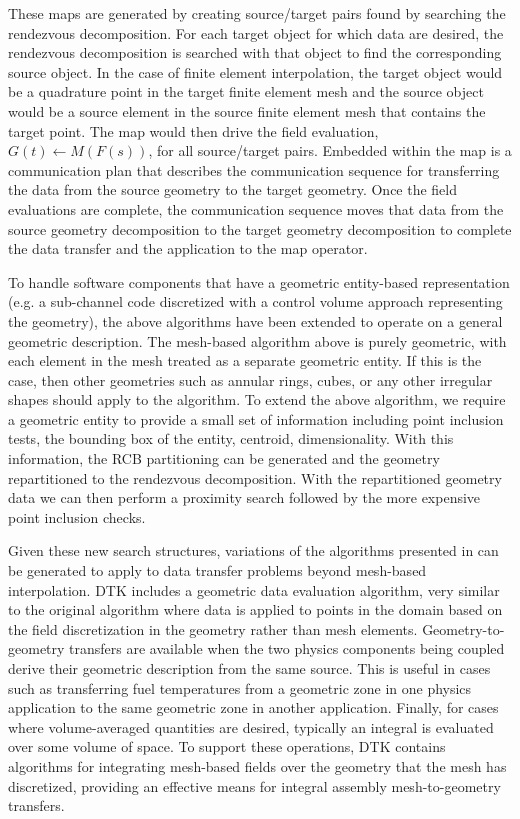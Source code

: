 \documentclass{mc2013}
\begin{document}
These maps are generated by creating source/target pairs found by
searching the rendezvous decomposition. For each target object for
which data are desired, the rendezvous decomposition is searched with
that object to find the corresponding source object. In the case of
finite element interpolation, the target object would be a quadrature
point in the target finite element mesh and the source object would be
a source element in the source finite element mesh that contains the
target point. The map would then drive the field evaluation,
$G(t)\leftarrow M(F(s))$, for all source/target pairs. Embedded within
the map is a communication plan that describes the communication
sequence for transferring the data from the source geometry to the
target geometry. Once the field evaluations are complete, the
communication sequence moves that data from the source geometry
decomposition to the target geometry decomposition to complete the
data transfer and the application to the map operator.

\label{subsec:general_geometry}

To handle software components that have a geometric entity-based
representation (e.g. a sub-channel code discretized with a control
volume approach representing the geometry), the above algorithms have
been extended to operate on a general geometric description. The
mesh-based algorithm above is purely geometric, with each element in
the mesh treated as a separate geometric entity. If this is the case,
then other geometries such as annular rings, cubes, or any other
irregular shapes should apply to the algorithm. To extend the above
algorithm, we require a geometric entity to provide a small set of
information including point inclusion tests, the bounding box of the
entity, centroid, dimensionality. With this information, the RCB
partitioning can be generated and the geometry repartitioned to the
rendezvous decomposition. With the repartitioned geometry data we can
then perform a proximity search followed by the more expensive point
inclusion checks.

Given these new search structures, variations of the algorithms
presented in \cite{Plimpton_2004} can be generated to apply to data
transfer problems beyond mesh-based interpolation. DTK includes a
geometric data evaluation algorithm, very similar to the original
algorithm where data is applied to points in the domain based on the
field discretization in the geometry rather than mesh
elements. Geometry-to-geometry transfers are available when the two
physics components being coupled derive their geometric description
from the same source. This is useful in cases such as transferring
fuel temperatures from a geometric zone in one physics application to
the same geometric zone in another application. Finally, for cases
where volume-averaged quantities are desired, typically an integral is
evaluated over some volume of space. To support these operations, DTK
contains algorithms for integrating mesh-based fields over the
geometry that the mesh has discretized, providing an effective means
for integral assembly mesh-to-geometry transfers.
\end{document}
